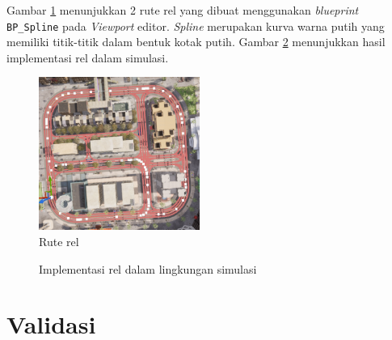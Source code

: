 Gambar \ref{fig:rel-route} menunjukkan 2 rute rel yang dibuat menggunakan
\textit{blueprint} \verb|BP_Spline| pada \textit{Viewport} editor.
\textit{Spline} merupakan kurva warna putih yang memiliki titik-titik dalam
bentuk kotak putih. Gambar \ref{fig:rel} menunjukkan hasil implementasi rel
dalam simulasi.

\begin{figure}[!h]
    \centering
    \includegraphics[width=0.47\textwidth]{resources/chapter-4/rel-route.png}
    \caption{Rute rel}
    \label{fig:rel-route}
\end{figure}

\begin{figure}[!h]
    \centering
    \hfill
    \caption{Implementasi rel dalam lingkungan simulasi}
    \label{fig:rel}
\end{figure}

\section{Validasi}

